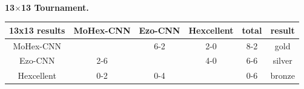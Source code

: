 \documentclass{icga}
\def\Ec{\mbox{\sc Ezo-CNN}}
\def\Hent{\mbox{\sc Hexcellent}}
\def\Mc{\mbox{\sc MoHex-CNN}}
\begin{document}
~

{\large\bf 13$\times$13 Tournament.}

\hfill\begin{tabular}{|c|c|c|c|c|c|}
\hline 13x13 results &\Mc{} &\Ec{}  &\Hent{} & total & result \\ 
\hline \Mc{}         &      &  6-2  & 2-0  & 8-2   & gold \\
\hline \Ec{}         &  2-6 &       & 4-0  & 6-6   & silver \\
\hline \Hent{}       &  0-2 &  0-4  &      & 0-6   & bronze \\
\hline
\end{tabular}\hfill~
\end{document}
